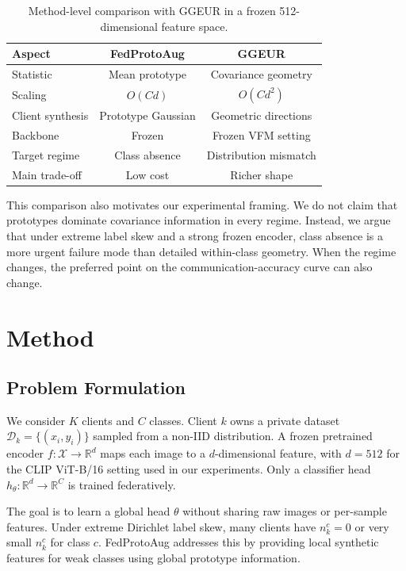 ﻿\documentclass[runningheads]{llncs}
\newcommand{\method}{FedProtoAug}
\newcommand{\clip}{CLIP}
\newcommand{\R}{\mathbb{R}}
\begin{document}
\begin{table}[t]
\centering
\caption{Method-level comparison with GGEUR in a frozen 512-dimensional feature space.}
\label{tab:method_compare}
\begin{tabular}{lcc}
\toprule
Aspect & \method{} & GGEUR \\
\midrule
Statistic & Mean prototype & Covariance geometry \\
Scaling & $O(Cd)$ & $O(Cd^2)$ \\
Client synthesis & Prototype Gaussian & Geometric directions \\
Backbone & Frozen & Frozen VFM setting \\
Target regime & Class absence & Distribution mismatch \\
Main trade-off & Low cost & Richer shape \\
\bottomrule
\end{tabular}
\end{table}

This comparison also motivates our experimental framing. We do not claim that prototypes dominate covariance information in every regime. Instead, we argue that under extreme label skew and a strong frozen encoder, class absence is a more urgent failure mode than detailed within-class geometry. When the regime changes, the preferred point on the communication-accuracy curve can also change.

\section{Method}

\subsection{Problem Formulation}
We consider $K$ clients and $C$ classes. Client $k$ owns a private dataset $\mathcal{D}_k=\{(x_i,y_i)\}$ sampled from a non-IID distribution. A frozen pretrained encoder $f:\mathcal{X}\rightarrow\R^d$ maps each image to a $d$-dimensional feature, with $d=512$ for the \clip{} ViT-B/16 setting used in our experiments. Only a classifier head $h_\theta:\R^d\rightarrow\R^C$ is trained federatively.

The goal is to learn a global head $\theta$ without sharing raw images or per-sample features. Under extreme Dirichlet label skew, many clients have $n_k^c=0$ or very small $n_k^c$ for class $c$. \method{} addresses this by providing local synthetic features for weak classes using global prototype information.
\end{document}
